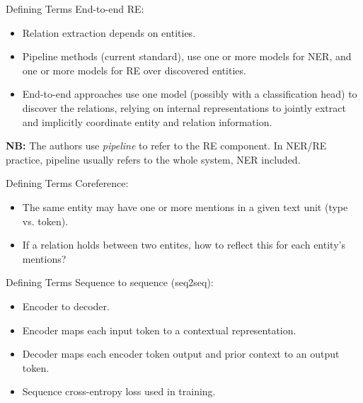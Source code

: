\documentclass[usenames,dvipsnames,pdf]{beamer}
\begin{document}
        \begin{frame}{Defining Terms}
          End-to-end RE:
          \begin{itemize}
          \item
            Relation extraction depends on entities.
          \item
            Pipeline methods (current standard),
            use one or more models for NER,
            and one or more models for RE over discovered entities.
          \item
            End-to-end approaches use one model
            (possibly with a classification head)
            to discover the relations,
            relying on internal representations to jointly extract
            and implicitly coordinate entity and relation information.
          \end{itemize}

          \textbf{NB:}  The authors use \textit{pipeline} to refer to the RE component.
          In NER/RE practice, pipeline usually refers to the whole system, NER included.  
        \end{frame}

        \begin{frame}{Defining Terms}
          Coreference:
          \begin{itemize}
          \item
            The same entity may have one or more mentions in a given text unit (type vs. token).
          \item
            If a relation holds between two entites, how to reflect this for each entity's mentions?
          \end{itemize}
        \end{frame}

        \begin{frame}{Defining Terms}
          Sequence to sequence (seq2seq):
          \begin{itemize}
          \item
            Encoder to decoder.
          \item
            Encoder maps each input token to a contextual representation.
          \item
            Decoder maps each encoder token output and prior context to an output token.
          \item
            Sequence cross-entropy loss used in training.
          \end{itemize}
        \end{frame}
        
\end{document}
